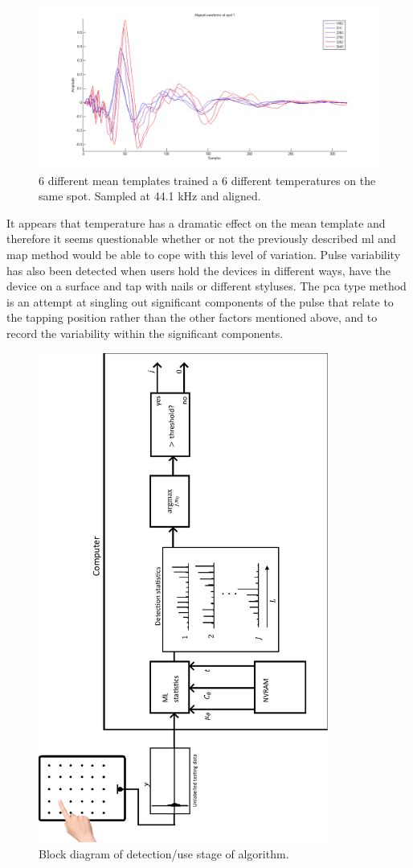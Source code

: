 \begin{figure}[!]
\centering
\includegraphics[width=150mm]{shiftOverTemperature.png}
\caption{6 different mean templates trained a 6 different temperatures on the same spot. Sampled at 44.1 kHz and aligned.}\label{fig:shiftOverTemperature}
\end{figure}
It appears that temperature has a dramatic effect on the mean template and therefore it seems questionable whether or not the previously described \gls{ml} and \gls{map} method would be able to cope with this level of variation. Pulse variability has also been detected when users hold the devices in different ways, have the device on a surface and tap with nails or different styluses. The \gls{pca} type method is an attempt at singling out significant components of the pulse that relate to the tapping position rather than the other factors mentioned above, and to record the variability within the significant components.

\begin{figure}[!]
\centering
\includegraphics[width=360px]{testingSystemPlot.pdf}
\caption{Block diagram of detection/use stage of algorithm.}\label{fig:testingSystemPlot}
\end{figure}

